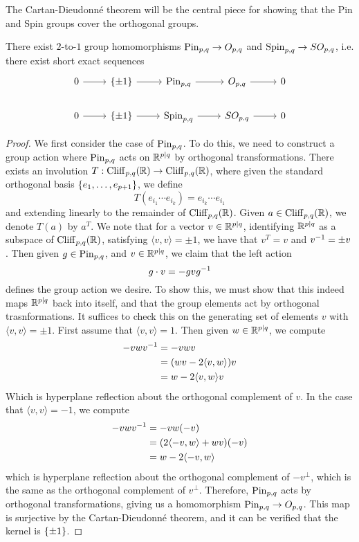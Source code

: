 %
The Cartan-Dieudonn\'e theorem will be the central piece for showing that the
Pin and Spin groups cover the orthogonal groups.
%
\begin{thm}
There exist $2$-to-$1$ group homomorphisms $\mathrm{Pin}_{p,q} \to O_{p,q}$ and
$\mathrm{Spin}_{p,q} \to SO_{p,q}$, i.e. there exist short exact sequences
\[\begin{tikzcd}
0 \ar[r] & \set{\pm 1} \ar[r] & \Pin_{p,q} \ar[r] & O_{p,q} \ar[r] & 0 \\
0 \ar[r] & \set{\pm 1} \ar[r] &\Spin_{p,q} \ar[r] & SO_{p.q} \ar[r] & 0
\end{tikzcd}\]
\end{thm}
%
\begin{proof}
We first consider the case of $\mathrm{Pin}_{p,q}$. To do this, we need to construct
a group action where $\mathrm{Pin}_{p,q}$ acts on $\mathbb{R}^{p|q}$ by orthogonal transformations.
There exists an involution $T : \operatorname{Cliff}_{p,q}(\mathbb{R}) \to \operatorname{Cliff}_{p,q}(\mathbb{R})$, where given
the standard orthogonal basis $\left\lbrace e_1, \ldots, e_{p+1} \right\rbrace$, we define
\[
T(e_{i_1}\cdots e_{i_k}) = e_{i_k}\cdots e_{i_1}
\]
and extending linearly to the remainder of $\operatorname{Cliff}_{p,q}(\mathbb{R})$. Given $a \in
\operatorname{Cliff}_{p,q}(\mathbb{R})$, we denote $T(a)$ by $a^T$. We note that for a vector
$v \in \mathbb{R}^{p|q}$, identifying $\mathbb{R}^{p|q}$ as a subspace of $\operatorname{Cliff}_{p,q}(\mathbb{R})$,
satisfying $\langle v,v \rangle = \pm 1$, we have that $v^T = v$ and
$v^{-1} = \pm v$. Then given $g \in \mathrm{Pin}_{p,q}$, and $v \in \mathbb{R}^{p|q}$, we claim
that the left action
\[
g \cdot v = -gvg^{-1}
\]
defines the group action we desire. To show this, we must show that this indeed
maps $\mathbb{R}^{p|q}$ back into itself, and that the group elements act by orthogonal
trasnformations. It suffices to check this on the generating set of elements
$v$ with $\langle v,v \rangle = \pm 1$. First assume that $\langle v,v \rangle = 1$.
Then given $w \in \mathbb{R}^{p|q}$, we compute
%
\begin{align*}
-vwv^{-1} &= -vwv \\
&= (wv - 2\langle v,w \rangle)v \\
&= w - 2\langle v,w \rangle v
\end{align*}
%
Which is hyperplane reflection about the orthogonal complement of $v$. In the
case that $\langle v,v \rangle = -1$, we compute
%
\begin{align*}
-vwv^{-1} &= -vw(-v) \\
&= (2\langle -v,w\rangle + wv)(-v) \\
&= w - 2\langle -v,w \rangle
\end{align*}
which is hyperplane reflection about the orthogonal complement of $-v^\perp$,
which is the same as the orthogonal complement of $v^\perp$. Therefore,
$\mathrm{Pin}_{p,q}$ acts by orthogonal transformations, giving us a homomorphism
$\mathrm{Pin}_{p,q} \to O_{p,q}$. This map is surjective by the Cartan-Dieudonn\'e
theorem, and it can be verified that the kernel is $\left\lbrace \pm 1 \right\rbrace$.
%
\end{proof}
